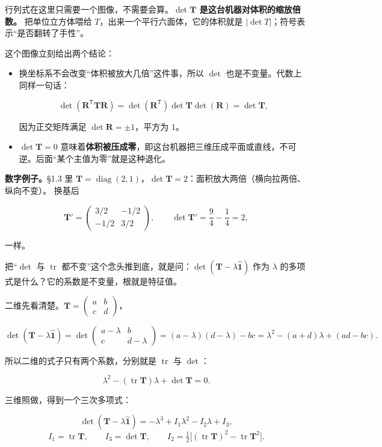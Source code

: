 \documentclass[11pt]{ctexart}
\newcommand{\ten}[1]{\mathbf{#1}}
\newcommand{\unitd}{\hat{\ten{1}}}
\let\origsubhdr\subhdr
\renewcommand{\subhdr}[1]{\par\needspace{3\baselineskip}\origsubhdr{#1}}
\begin{document}
行列式在这里只需要一个图像，不需要会算。\textbf{$\det\ten T$ 是这台机器对体积的缩放倍数。}
把单位立方体喂给 $T$，出来一个平行六面体，它的体积就是 $|\det T|$；符号表示“是否翻转了手性”。

这个图像立刻给出两个结论：
\begin{itemize}
\item 换坐标系不会改变“体积被放大几倍”这件事，所以 $\det$ 也是不变量。代数上同样一句话：

\[
\det(\ten R^{\mathsf T}\ten T\ten R)=\det(\ten R^{\mathsf T})\det\ten T\det(\ten R)=\det\ten T,
\]

因为正交矩阵满足 $\det\ten R=\pm1$，平方为 $1$。
\item $\det\ten T=0$ 意味着\textbf{体积被压成零}，即这台机器把三维压成平面或直线，不可逆。后面“某个主值为零”就是这种退化。
\end{itemize}

\textbf{数字例子。}§1.3 里 $\ten T=\operatorname{diag}(2,1)$，$\det\ten T=2$：面积放大两倍（横向拉两倍、纵向不变）。
换基后

\[
\ten T'=\begin{pmatrix}3/2&-1/2\\-1/2&3/2\end{pmatrix},
\qquad
\det\ten T'=\frac94-\frac14=2 ,
\]

一样。


把“$\det$ 与 $\operatorname{tr}$ 都不变”这个念头推到底，就是问：$\det(\ten T-\lambda\unitd)$ 作为 $\lambda$ 的多项式是什么？它的系数是不变量，根就是特征值。

二维先看清楚。$\ten T=\begin{pmatrix}a&b\\c&d\end{pmatrix}$，

\[
\det(\ten T-\lambda\unitd)=\det\begin{pmatrix}a-\lambda&b\\c&d-\lambda\end{pmatrix}
=(a-\lambda)(d-\lambda)-bc=\lambda^2-(a+d)\lambda+(ad-bc).
\]

所以二维的式子只有两个系数，分别就是 $\operatorname{tr}$ 与 $\det$：

\[
\lambda^2-(\operatorname{tr}\ten T)\lambda+\det\ten T=0 .
\]

三维照做，得到一个三次多项式：

\[
\det(\ten T-\lambda\unitd)=-\lambda^3+I_1\lambda^2-I_2\lambda+I_3 ,
\]
\[
I_1=\operatorname{tr}\ten T,\qquad
I_3=\det\ten T,\qquad
I_2=\tfrac12\bigl[(\operatorname{tr}\ten T)^2-\operatorname{tr}\ten T^2\bigr].
\]
\end{document}
